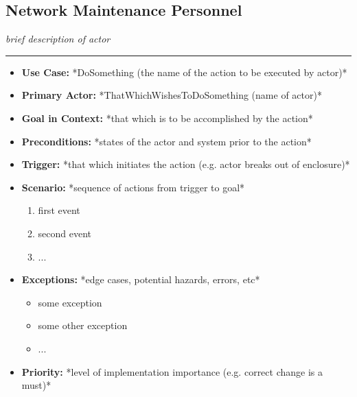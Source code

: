 \documentclass[12pt]{article}
\begin{document}
    \subsection{Network Maintenance Personnel}
    \textit{brief description of actor}
    \par\noindent\rule{\textwidth}{0.4pt}    
    \begin{itemize}
        \item[]\textbf{Use Case:}                                
            *DoSomething (the name of the action to be executed by actor)*

        \item[]\textbf{Primary Actor:}
            *ThatWhichWishesToDoSomething (name of actor)*

        \item[]\textbf{Goal in Context:}
            *that which is to be accomplished by the action*

        \item[]\textbf{Preconditions:}
            *states of the actor and system prior to the action*

        \item[]\textbf{Trigger:}
            *that which initiates the action (e.g. actor breaks out of enclosure)*

        \item[]\textbf{Scenario:}
            *sequence of actions from trigger to goal*
            \begin{enumerate}
                \item first event
                \item second event
                \item ...
            \end{enumerate}

        \item[]\textbf{Exceptions:}
            *edge cases, potential hazards, errors, etc*
            \begin{itemize}
                \item[] some exception
                \item[] some other exception                
                \item[] ...
            \end{itemize}

        \item[]\textbf{Priority:}
            *level of implementation importance (e.g. correct change is a must)*


\end{itemize}
\end{document}
